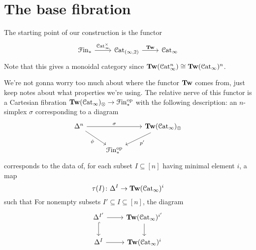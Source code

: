 \documentclass[main.tex]{subfiles}
\begin{document}
\section{The base fibration}
\label{sec:base_fibrations}

The starting point of our construction is the functor
\begin{equation*}
  \begin{tikzcd}
    \Finp
    \arrow[r, "\ICat^{\times}"]
    & \Cat_{(\infty, 2)}
    \arrow[r, "\Tw"]
    & \ICat
  \end{tikzcd}
\end{equation*}
Note that this gives a monoidal category since $\mathbf{Tw}(\mathcal{C}\mathrm{at}_{\infty}^{n})\cong \mathbf{Tw}(\mathcal{C}\mathrm{at}_{\infty})^{n}$.

We're not gonna worry too much about where the functor $\mathbf{Tw}$ comes from, just keep notes about what properties we're using. The relative nerve of this functor is a Cartesian fibration $\mathbf{Tw}(\mathcal{C}\mathrm{at}_{\infty})_{\otimes} \to \mathcal{F}\mathrm{in}_{*}^{\mathrm{op}}$ with the following description: an $n$-simplex $\sigma$ corresponding to a diagram
\begin{equation*}
  \begin{tikzcd}
    \Delta^{n}
    \arrow[rr, "\sigma"]
    \arrow[dr, swap, "\phi"]
    && \Tw(\ICat)_{\otimes}
    \arrow[dl, "p'"]
    \\
    & \Finp\op
  \end{tikzcd}
\end{equation*}
corresponds to the data of, for each subset $I \subseteq [n]$ having minimal element $i$, a map
\begin{equation*}
  \tau(I)\colon \Delta^{I} \to \mathbf{Tw}(\mathcal{C}\mathrm{at}_{\infty})^{i}
\end{equation*}
such that For nonempty subsets $I' \subseteq I \subseteq [n]$, the diagram
\begin{equation*}
  \begin{tikzcd}
    \Delta^{I'}
    \arrow[r]
    \arrow[d, hook]
    & \Tw(\ICat)^{i'}
    \arrow[d]
    \\
    \Delta^{I}
    \arrow[r]
    & \Tw(\ICat)^{i}
  \end{tikzcd}
\end{equation*}
\end{document}
